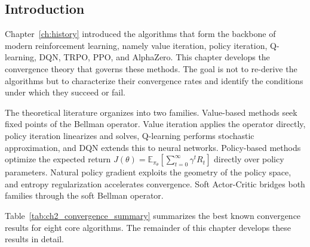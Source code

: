 
\subsection{Introduction}
\label{sec:ch2_intro}

Chapter~\ref{ch:history} introduced the algorithms that form the backbone of modern reinforcement learning, namely value iteration, policy iteration, Q-learning, DQN, TRPO, PPO, and AlphaZero. This chapter develops the convergence theory that governs these methods. The goal is not to re-derive the algorithms but to characterize their convergence rates and identify the conditions under which they succeed or fail.

The theoretical literature organizes into two families. Value-based methods seek fixed points of the Bellman operator. Value iteration applies the operator directly, policy iteration linearizes and solves, Q-learning performs stochastic approximation, and DQN extends this to neural networks. Policy-based methods optimize the expected return $J(\theta) = \mathbb{E}_{\pi_\theta}[\sum_{t=0}^\infty \gamma^t R_t]$ directly over policy parameters. Natural policy gradient exploits the geometry of the policy space, and entropy regularization accelerates convergence. Soft Actor-Critic bridges both families through the soft Bellman operator.

Table~\ref{tab:ch2_convergence_summary} summarizes the best known convergence results for eight core algorithms. The remainder of this chapter develops these results in detail.

